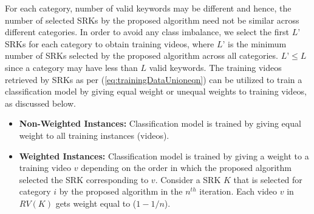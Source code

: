 For each category, number of valid keywords may be different and hence, the number of selected SRKs by the proposed algorithm need not be similar across different categories. In order to avoid any class imbalance, we select the first $L\text{'}$ SRKs for each category to obtain training videos, where $L\text{'}$ is the minimum number of SRKs selected by the proposed algorithm across all categories. $L\text{'} \le  L$ since a category may have less than $L$ valid keywords. The training videos retrieved by SRKs as per (\ref{eq:trainingDataUnioneqn}) can be utilized to train a classification model by giving equal weight or unequal weights to training videos, as discussed below. 
\begin{itemize}
\item \textbf{Non-Weighted Instances:} Classification model is trained by giving equal weight to all training instances (videos). 
\item \textbf{Weighted Instances:} Classification model is trained by giving a weight to a training video $v$ depending on the order in which the proposed algorithm selected the SRK corresponding to $v$. Consider a SRK $K$ that is selected for category $i$ by the proposed algorithm in the $n^{th}$ iteration. Each video $v$ in $RV(K)$ gets weight equal to ($1-1/n$). 
\end{itemize}
